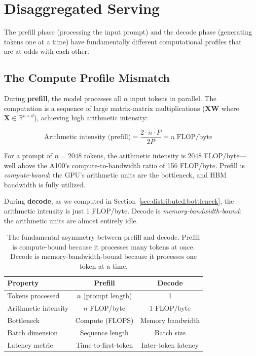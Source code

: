 \section{Disaggregated Serving}
\label{sec:distributed:disaggregated}

%
The prefill phase (processing the input prompt) and the decode phase (generating tokens one at a time) have fundamentally different computational profiles that are at odds with each other.

\subsection{The Compute Profile Mismatch}

During \textbf{prefill}, the model processes all $n$ input tokens in parallel. The computation is a sequence of large matrix-matrix multiplications ($\mathbf{X} \mathbf{W}$ where $\mathbf{X} \in \mathbb{R}^{n \times d}$), achieving high arithmetic intensity:

\begin{equation}
\label{eq:prefill-intensity}
\text{Arithmetic intensity (prefill)} = \frac{2 \cdot n \cdot P}{2P} = n \;\text{FLOP/byte}
\end{equation}

\noindent For a prompt of $n = 2048$ tokens, the arithmetic intensity is 2048 FLOP/byte---well above the A100's compute-to-bandwidth ratio of 156 FLOP/byte. Prefill is \emph{compute-bound}: the GPU's arithmetic units are the bottleneck, and HBM bandwidth is fully utilized.

During \textbf{decode}, as we computed in Section~\ref{sec:distributed:bottleneck}, the arithmetic intensity is just 1 FLOP/byte. Decode is \emph{memory-bandwidth-bound}: the arithmetic units are almost entirely idle.

\begin{table}[h]
\centering
\begin{tabular}{lcc}
\toprule
\textbf{Property} & \textbf{Prefill} & \textbf{Decode} \\
\midrule
Tokens processed & $n$ (prompt length) & 1 \\
Arithmetic intensity & $n$ FLOP/byte & 1 FLOP/byte \\
Bottleneck & Compute (FLOPS) & Memory bandwidth \\
Batch dimension & Sequence length & Batch size \\
Latency metric & Time-to-first-token & Inter-token latency \\
\bottomrule
\end{tabular}
\caption{The fundamental asymmetry between prefill and decode. Prefill is compute-bound because it processes many tokens at once. Decode is memory-bandwidth-bound because it processes one token at a time.}
\label{tab:prefill-decode}
\end{table}

